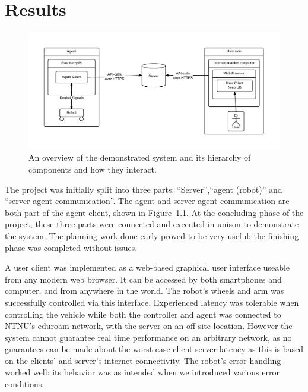 \chapter{Results}
\begin{figure}[H]
\centering
\includegraphics[width=\textwidth]{graphics/robot-implementation.pdf}
\caption{An overview of the demonstrated system and its hierarchy of components and how they interact.}
\label{fig:robot-implementation}
\end{figure}

The project was initially split into three parts:
``Server'',``agent (robot)'' and ``server-agent communication''.
The agent and server-agent communication are both part of the agent client, shown in Figure~\ref{fig:robot-implementation}.
At the concluding phase of the project, these three parts were connected and executed in unison to demonstrate the system.
The planning work done early proved to be very useful: the finishing phase was completed without issues.

A user client was implemented as a web-based graphical user interface useable from any modern web browser.
It can be accessed by both smartphones and computer, and from anywhere in the world. 
The robot's wheels and arm was successfully controlled via this interface.
Experienced latency was tolerable when controlling the vehicle while both the controller and agent was connected to NTNU's eduroam network, with the server on an off-site location.
However the system cannot guarantee real time performance on an arbitrary network, as no guarantees can be made about the worst case client-server latency as this is based on the clients' and server's internet connectivity.
The robot's error handling worked well: its behavior was as intended when we introduced various error conditions.

